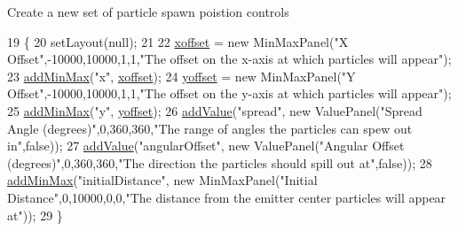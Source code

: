 Create a new set of particle spawn poistion controls 
\begin{DoxyCode}
19                               \{
20         setLayout(null);
21     
22         \mbox{\hyperlink{classorg_1_1newdawn_1_1slick_1_1tools_1_1peditor_1_1_position_controls_a5359752fcf9f38522fe43da65b639303}{xoffset}} = \textcolor{keyword}{new} MinMaxPanel(\textcolor{stringliteral}{"X Offset"},-10000,10000,1,1,\textcolor{stringliteral}{"The offset on the x-axis at which
       particles will appear"});
23         \mbox{\hyperlink{classorg_1_1newdawn_1_1slick_1_1tools_1_1peditor_1_1_control_panel_aae097ab8bc9bd722af51818b15bcc823}{addMinMax}}(\textcolor{stringliteral}{"x"}, \mbox{\hyperlink{classorg_1_1newdawn_1_1slick_1_1tools_1_1peditor_1_1_position_controls_a5359752fcf9f38522fe43da65b639303}{xoffset}});
24         \mbox{\hyperlink{classorg_1_1newdawn_1_1slick_1_1tools_1_1peditor_1_1_position_controls_a846a05883448e390fe31c3a726619b86}{yoffset}} = \textcolor{keyword}{new} MinMaxPanel(\textcolor{stringliteral}{"Y Offset"},-10000,10000,1,1,\textcolor{stringliteral}{"The offset on the y-axis at which
       particles will appear"});
25         \mbox{\hyperlink{classorg_1_1newdawn_1_1slick_1_1tools_1_1peditor_1_1_control_panel_aae097ab8bc9bd722af51818b15bcc823}{addMinMax}}(\textcolor{stringliteral}{"y"}, \mbox{\hyperlink{classorg_1_1newdawn_1_1slick_1_1tools_1_1peditor_1_1_position_controls_a846a05883448e390fe31c3a726619b86}{yoffset}});
26         \mbox{\hyperlink{classorg_1_1newdawn_1_1slick_1_1tools_1_1peditor_1_1_control_panel_af298d1803e4450ed4ffe735500bb7c60}{addValue}}(\textcolor{stringliteral}{"spread"}, \textcolor{keyword}{new} ValuePanel(\textcolor{stringliteral}{"Spread Angle (degrees)"},0,360,360,\textcolor{stringliteral}{"The range of angles
       the particles can spew out in"},\textcolor{keyword}{false}));
27         \mbox{\hyperlink{classorg_1_1newdawn_1_1slick_1_1tools_1_1peditor_1_1_control_panel_af298d1803e4450ed4ffe735500bb7c60}{addValue}}(\textcolor{stringliteral}{"angularOffset"}, \textcolor{keyword}{new} ValuePanel(\textcolor{stringliteral}{"Angular Offset (degrees)"},0,360,360,\textcolor{stringliteral}{"The
       direction the particles should spill out at"},\textcolor{keyword}{false}));
28         \mbox{\hyperlink{classorg_1_1newdawn_1_1slick_1_1tools_1_1peditor_1_1_control_panel_aae097ab8bc9bd722af51818b15bcc823}{addMinMax}}(\textcolor{stringliteral}{"initialDistance"}, \textcolor{keyword}{new} MinMaxPanel(\textcolor{stringliteral}{"Initial Distance"},0,10000,0,0,\textcolor{stringliteral}{"The distance
       from the emitter center particles will appear at"}));
29     \}
\end{DoxyCode}


